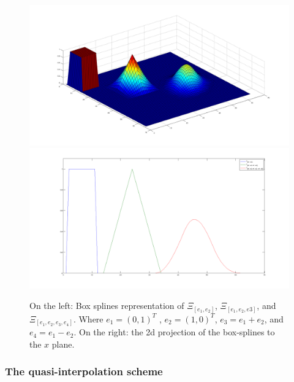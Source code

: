 \documentclass[proc]{edpsmath}
\begin{document}
\begin{figure}[h!]
	\includegraphics[scale=0.15]{figures/boxsplines3d.png}
	\includegraphics[scale=0.15]{figures/boxsplines2d.png}
	\caption{On the left: Box splines representation of $\Xi_[e_1, e_2]$, $\Xi_[e_1, e_2, e3]$, and $\Xi_[e_1, e_2, e_3, e_4]$. Where $e_1 = ( 0, 1 )^T$ , $e_2 = ( 1, 0)^T$, $e_3 = e_1 + e_2$, and $e_4 = e_1 - e_2$. On the right: the 2d projection of the box-splines to the $x$ plane.}
	\label{fig:boxsplines3d}
\end{figure}

	


\subsubsection{The quasi-interpolation scheme}
\end{document}
